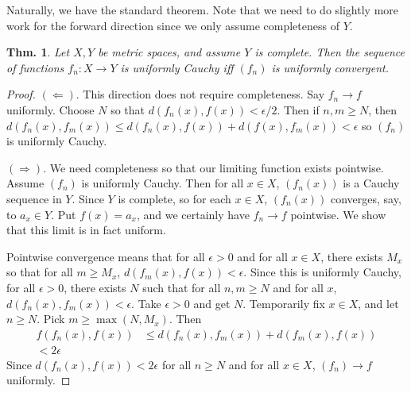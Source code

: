 \documentclass[12pt, a4paper]{book}
\newtheorem{theorem}{Thm.}[section]
\theoremstyle{nonumberplain}
\newtheorem{proof}{Proof}
\begin{document}
Naturally, we have the standard theorem.
Note that we need to do slightly more work for the forward direction since we only assume completeness of $Y$.
\begin{theorem}
    Let $X,Y$ be metric spaces, and assume $Y$ is complete. Then the sequence of functions $f_n:X\to Y$ is uniformly
    Cauchy iff $(f_n)$ is uniformly convergent.
\end{theorem}
\begin{proof}
    $(\Leftarrow)$.
    This direction does not require completeness.
    Say $f_n\to f$ uniformly.
    Choose $N$ so that $d(f_n(x),f(x))<\epsilon/2$.
    Then if $n,m\geq N$, then $d(f_n(x),f_m(x))\leq d(f_n(x),f(x))+d(f(x),f_m(x))<\epsilon$ so $(f_n)$ is uniformly Cauchy.

    $(\Rightarrow)$.
    We need completeness so that our limiting function exists pointwise.
    Assume $(f_n)$ is uniformly Cauchy.
    Then for all $x\in X$, $(f_n(x))$ is a Cauchy sequence in $Y$.
    Since $Y$ is complete, so for each $x\in X$, $(f_n(x))$ converges, say, to $a_x\in Y$.
    Put $f(x)=a_x$, and we certainly have $f_n\to f$ pointwise.
    We show that this limit is in fact uniform.

    Pointwise convergence means that for all $\epsilon>0$ and for all $x\in X$, there exists $M_x$ so that for all $m\geq M_x$,
    $d(f_m(x),f(x))<\epsilon$. Since this is uniformly Cauchy, for all $\epsilon>0$, there exists $N$ such that
    for all $n,m\geq N$ and for all $x$, $d(f_n(x),f_m(x))<\epsilon$. Take $\epsilon>0$ and get $N$. Temporarily fix
    $x\in X$, and let $n\geq N$. Pick $m\geq\max(N,M_x)$. Then
    \begin{align*}
        f(f_n(x),f(x)) &\leq d(f_n(x),f_m(x))+d(f_m(x),f(x))\\
        <2\epsilon
    \end{align*}
    Since $d(f_n(x),f(x))<2\epsilon$ for all $n\geq N$ and for all $x\in X$, $(f_n)\to f$ uniformly.
\end{proof}
\end{document}
